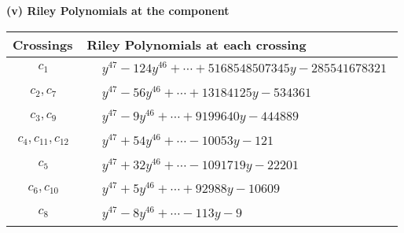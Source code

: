 \documentclass[1p]{elsarticle_modified}
\theoremstyle{definition}
\begin{document}
\flushleft \textbf{(v) Riley Polynomials at the component}\newline \\
\begin{tabular}{m{50pt}|m{274pt}}
Crossings & \hspace{64pt}Riley Polynomials at each crossing \\
\hline $$\begin{aligned}c_{1}\end{aligned}$$&$\begin{aligned}
&y^{47}-124 y^{46}+\cdots+5168548507345 y-285541678321
\end{aligned}$\\
\hline $$\begin{aligned}c_{2},c_{7}\end{aligned}$$&$\begin{aligned}
&y^{47}-56 y^{46}+\cdots+13184125 y-534361
\end{aligned}$\\
\hline $$\begin{aligned}c_{3},c_{9}\end{aligned}$$&$\begin{aligned}
&y^{47}-9 y^{46}+\cdots+9199640 y-444889
\end{aligned}$\\
\hline $$\begin{aligned}c_{4},c_{11},c_{12}\end{aligned}$$&$\begin{aligned}
&y^{47}+54 y^{46}+\cdots-10053 y-121
\end{aligned}$\\
\hline $$\begin{aligned}c_{5}\end{aligned}$$&$\begin{aligned}
&y^{47}+32 y^{46}+\cdots-1091719 y-22201
\end{aligned}$\\
\hline $$\begin{aligned}c_{6},c_{10}\end{aligned}$$&$\begin{aligned}
&y^{47}+5 y^{46}+\cdots+92988 y-10609
\end{aligned}$\\
\hline $$\begin{aligned}c_{8}\end{aligned}$$&$\begin{aligned}
&y^{47}-8 y^{46}+\cdots-113 y-9
\end{aligned}$\\
\hline
\end{tabular}\\~\\
\end{document}
